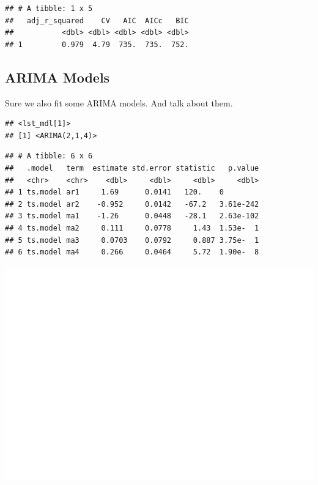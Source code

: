 \documentclass[AER]{AEA}
\begin{document}
\begin{verbatim}
## # A tibble: 1 x 5
##   adj_r_squared    CV   AIC  AICc   BIC
##           <dbl> <dbl> <dbl> <dbl> <dbl>
## 1         0.979  4.79  735.  735.  752.
\end{verbatim}

\hypertarget{arima-models}{%
\subsection{ARIMA Models}\label{arima-models}}

Sure we also fit some ARIMA models. And talk about them.

\begin{verbatim}
## <lst_mdl[1]>
## [1] <ARIMA(2,1,4)>
\end{verbatim}

\begin{verbatim}
## # A tibble: 6 x 6
##   .model   term  estimate std.error statistic   p.value
##   <chr>    <chr>    <dbl>     <dbl>     <dbl>     <dbl>
## 1 ts.model ar1     1.69      0.0141   120.    0        
## 2 ts.model ar2    -0.952     0.0142   -67.2   3.61e-242
## 3 ts.model ma1    -1.26      0.0448   -28.1   2.63e-102
## 4 ts.model ma2     0.111     0.0778     1.43  1.53e-  1
## 5 ts.model ma3     0.0703    0.0792     0.887 3.75e-  1
## 6 ts.model ma4     0.266     0.0464     5.72  1.90e-  8
\end{verbatim}

\includegraphics{Lab2_Group_report_files/figure-latex/unnamed-chunk-10-1.pdf}
\end{document}
